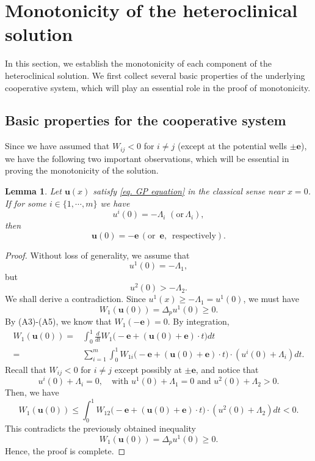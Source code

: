 \documentclass[11pt,twoside,reqno]{amsart}
\newcounter{assu}
\newtheorem{lemma}{Lemma}[section]
\numberwithin{equation}{section}
\begin{document}
\section{Monotonicity of the heteroclinical solution}

In this section, we establish the monotonicity of each component of the heteroclinical solution.
We first collect several basic properties of the underlying cooperative system, which will play an essential role in the proof of monotonicity.

\subsection{Basic properties for the cooperative system}
Since we have assumed that $W_{ij}<0$ for $i\neq j$ (except at the potential wells $\pm\mathbf{e}$), we have the following two important observations, which will be essential in proving the monotonicity of the solution.

\begin{lemma}\label{lem. boundary stability of pm e}
    Let $\mathbf{u}(x)$ satisfy \eqref{eq. GP equation} in the classical sense near $x=0$. If for some $i\in\{1,\cdots,m\}$ we have $$u^{i}(0)=-\Lambda_{i}\,\, (\mbox{or} \,\Lambda_{i}),$$ then $$\mathbf{u}(0)=-\mathbf{e}\, (\mbox{or }\,\mathbf{e},\, \mbox{ respectively}).$$
\end{lemma}
\begin{proof}
    Without loss of generality, we assume that
\[
u^1(0)=-\Lambda_1,
\]
but
\[
u^2(0)>-\Lambda_2.
\] 
We shall derive a contradiction. Since $u^{1}(x)\geq-\Lambda_{1}=u^{1}(0)$, we must have $$W_{1}(\mathbf{u}(0))=\Delta_{p}u^{1}(0)\geq0.$$
By (A3)-(A5), we know that $W_{1}(-\mathbf{e})=0$. By integration,
    \begin{align*}
        W_{1}(\mathbf{u}(0))=&\int_{0}^{1}\frac{d}{dt}W_{1}\Big(-\mathbf{e}+(\mathbf{u}(0)+\mathbf{e})\cdot t\Big)dt\\
        =&\sum_{i=1}^{m}\int_{0}^{1}W_{1i}\Big(-\mathbf{e}+(\mathbf{u}(0)+\mathbf{e})\cdot t\Big)\cdot(u^{i}(0)+\Lambda_{i})dt.
    \end{align*}
    Recall that $W_{ij}<0$ for $i\neq j$ except possibly at $\pm\mathbf{e}$, and notice that
    \begin{equation*}
        u^{i}(0)+\Lambda_{i}=0,\quad\mbox{with }u^{1}(0)+\Lambda_{1}=0\mbox{ and }u^{2}(0)+\Lambda_{2}>0.
    \end{equation*}
    Then, we have
    \begin{equation*}
        W_{1}(\mathbf{u}(0))\leq\int_{0}^{1}W_{12}\Big(-\mathbf{e}+(\mathbf{u}(0)+\mathbf{e})\cdot t\Big)\cdot(u^{2}(0)+\Lambda_{2})dt<0.
    \end{equation*}
    This contradicts the previously obtained inequality
\[
W_1(\mathbf u(0))=\Delta_pu^1(0)\geq0.
\]
Hence, the proof is complete.
\end{proof}
\end{document}
